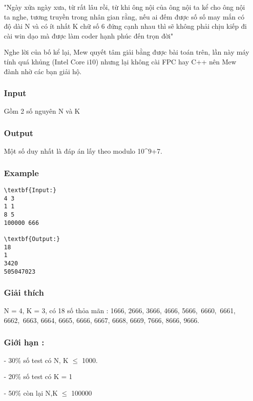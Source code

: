 

"Ngày xửa ngày xưa, từ rất lâu rồi, từ khi ông nội của ông nội ta kể cho ông nội ta nghe, tương truyền trong nhân gian rằng, nếu ai đếm được số số may mắn có độ dài N và có ít nhất K chữ số 6 đứng cạnh nhau thì sẽ không phải chịu kiếp đi cài win dạo mà được làm coder hạnh phúc đến trọn đời"

Nghe lời của bố kể lại, Mew quyết tâm giải bằng được bài toán trên, lần này máy tính quá khủng (Intel Core i10) nhưng lại không cài FPC hay C++ nên Mew đành nhờ các bạn giải hộ.

\subsubsection{Input}

Gồm 2 số nguyên N và K

\subsubsection{Output}

Một số duy nhất là đáp án lấy theo modulo 10^9+7.

\subsubsection{Example}
\begin{verbatim}
\textbf{Input:}
4 3
1 1
8 5
100000 666

\textbf{Output:}
18
1
3420
505047023
\end{verbatim}

\subsubsection{Giải thích}

N = 4, K = 3, có 18 số thỏa mãn : 1666, 2666, 3666, 4666, 5666, 6660, 6661, 6662, 6663, 6664, 6665, 6666, 6667, 6668, 6669, 7666, 8666, 9666.

\subsubsection{Giới hạn :}

- 30\% số test có N, K  $\le$  1000.

- 20\% số test có K = 1

- 50\% còn lại N,K  $\le$  100000 
